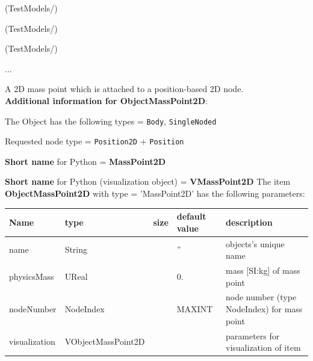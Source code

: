 \item {} (TestModels/)
\item {} (TestModels/)
\item {} (TestModels/)
\item  ...

\ei

%
\newpage

\label{sec:item:ObjectMassPoint2D}
A 2D mass point which is attached to a position-based 2D node.\vspace{12pt}
 \\{\bf Additional information for ObjectMassPoint2D}:
\bi
  \item The Object has the following types = \texttt{Body}, \texttt{SingleNoded}
  \item Requested node type = \texttt{Position2D} + \texttt{Position}
  \item {\bf Short name} for Python = {\bf MassPoint2D}  \item {\bf Short name} for Python (visualization object) = {\bf VMassPoint2D}\ei
\vspace{12pt} \noindent The item {\bf ObjectMassPoint2D} with type = 'MassPoint2D' has the following parameters:\vspace{-1cm}\\ 
\begin{center}
  \footnotesize
  \begin{longtable}{| p{4.5cm} | p{2.5cm} | p{0.5cm} | p{2.5cm} | p{6cm} |}
    \hline
    \bf Name & \bf type & \bf size & \bf default value & \bf description \\ \hline
    name &     String &      &     '' &     objects's unique name\\ \hline
    physicsMass &     UReal &      &     0. &     mass [SI:kg] of mass point\\ \hline
    nodeNumber &     NodeIndex &      &     MAXINT &     node number (type NodeIndex) for mass point\\ \hline
    visualization & VObjectMassPoint2D & & & parameters for visualization of item \\ \hline
	  \end{longtable}
	\end{center}
